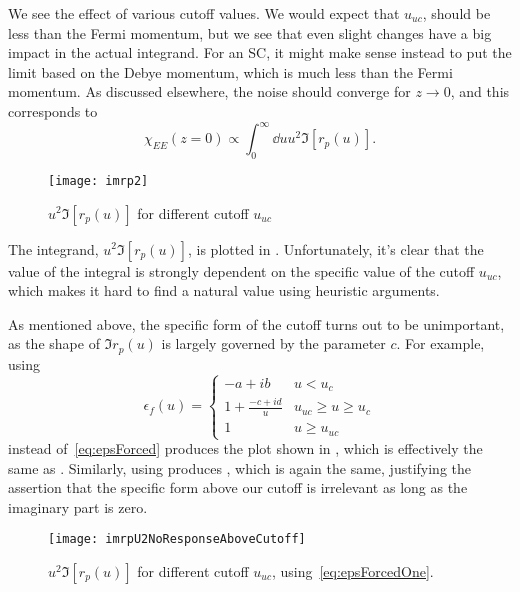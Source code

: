 \documentclass[../main.tex]{subfiles}
\begin{document}
	We see  the effect of various cutoff values.
	We would expect that $u_{uc}$, should be less than the Fermi momentum, but we see that even slight changes have a big impact in the actual integrand.
	For an SC, it might make sense instead to put the limit based on the Debye momentum, which is much less than the Fermi momentum.
	As discussed elsewhere, the noise should converge for $z \rightarrow 0$, and this corresponds to
	\begin{equation}
		\chi_{EE}(z = 0) \propto \int_0^\infty \dd{u} u^2 \Im[r_p(u)].
	\end{equation}

	\begin{figure}[htp]
		\centering
		\texttt{[image: imrp2]}
		\caption{$u^2 \Im[r_p(u)]$ for different cutoff $u_{uc}$} \label{fig:u2imrpVsCutoff}
	\end{figure}
	The integrand, $u^2 \Im[r_p(u)]$, is plotted in .
	Unfortunately, it's clear that the value of the integral is strongly dependent on the specific value of the cutoff $u_{uc}$, which makes it hard to find a natural value using heuristic arguments.

	As mentioned above, the specific form of the cutoff turns out to be unimportant, as the shape of $\Im r_p(u)$ is largely governed by the parameter $c$.
	For example, using
	\begin{equation}
		\epsilon_f(u) =
		\begin{cases}
			-a + i b & u < u_c \\
			1 + \frac{-c + i d}{u} &  u_{uc} \geq u \geq u_c \\
			1                      &  u \geq u_{uc}
		\end{cases} \label{eq:epsForcedOne}
	\end{equation}
	instead of~\eqref{eq:epsForced} produces the plot shown in , which is effectively the same as .
	Similarly, using  produces , which is again the same, justifying the assertion that the specific form above our cutoff is irrelevant as long as the imaginary part is zero.
	\begin{figure}[htp]
		\centering
		\texttt{[image: imrpU2NoResponseAboveCutoff]}
		\caption{$u^2 \Im[r_p(u)]$ for different cutoff $u_{uc}$, using~\eqref{eq:epsForcedOne}.} \label{fig:u2imrpVsCutoffNoResponseAbove}
	\end{figure}
\end{document}
